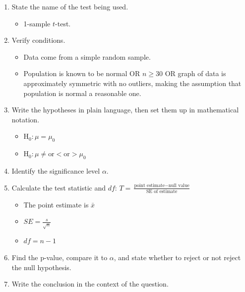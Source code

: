 \begin{termBox}{
\begin{enumerate}
\setlength{\itemsep}{0mm}
\item State the name of the test being used.\vspace{-1.5mm}
\begin{itemize}
\setlength{\itemsep}{0mm}
\item 1-sample $t$-test.
\end{itemize}
\item Verify conditions.\vspace{-1.5mm}
\begin{itemize}
\setlength{\itemsep}{0mm}
\item Data come from a simple random sample.
\item Population is known to be normal OR $n\ge 30$ OR graph of data is approximately symmetric with no outliers, making the assumption that population is normal a reasonable one.
\end{itemize}
\item Write the hypotheses in plain language, then set them up in mathematical notation.\vspace{-1.5mm}
\begin{itemize}
\setlength{\itemsep}{0mm}
\item H$_0: \mu = \mu_0$
\item H$_0: \mu \ne \text{or} < \text{or} > \mu_0$
\end{itemize}
\item Identify the significance level $\alpha$.
\item Calculate the test statistic and $df$: $T = \frac{\text{point estimate} - \text{null value}}{\text{SE of estimate}}$
\begin{itemize}
\setlength{\itemsep}{0mm}
\item The point estimate is $\bar{x}$
\item $SE = \frac{s}{\sqrt{n}}$
\item $df=n-1$
\end{itemize}
\item Find the p-value, compare it to $\alpha$, and state whether to reject or not reject the null hypothesis.
\item Write the conclusion in the context of the question.
\end{enumerate}}
\end{termBox}

